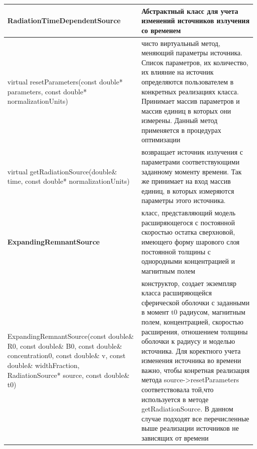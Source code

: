 \begin{small}
	\label{sourceTimeDependentMethods1}
	\begin{xtabular}{|p{0.5\textwidth}|p{0.5\textwidth}|}
		\hline
		\textbf{RadiationTimeDependentSource} & Абстрактный класс для учета изменений источников излучения со временем\\
		\hline
		virtual resetParameters(const double* parameters, const double* normalizationUnits) & чисто виртуальный метод, меняющий параметры источника. Список параметров, их количество, их влияние на источник определяются пользователем в конкретных реализациях класса. Принимает массив параметров и массив единиц в которых они измерены. Данный метод применяется в процедурах оптимизации\\
		\hline
		virtual getRadiationSource(double\& time, const double* normalizationUnits) & возвращает источник излучения с параметрами соответствующими заданному моменту времени. Так же принимает на вход массив единиц, в которых измеряются параметры этого источника.\\
		\hline
		\textbf{ExpandingRemnantSource} & класс, представляющий модель расширяющегося с постоянной скоростью остатка сверхновой, имеющего форму шарового слоя постоянной толщины с однородными концентрацией и магнитным полем \\
		\hline
		ExpandingRemnantSource(const double\& R0, const double\& B0, const double\& concentration0, const double\& v, const double\& widthFraction, RadiationSource* source, const double\& t0) & конструктор, создает экземпляр класса расширяющейся сферической оболочки с заданными в момент t0 радиусом, магнитным полем, концентрацией, скоростью расширения, отношением толщины оболочки к радиусу и моделью источника. Для коректного учета изменения источника во времени важно, чтобы конретная реализация метода source->resetParameters соответствовала той,что используется в методе getRadiationSource. В данном случае подходят все перечисленные выше реализации источников не зависящих от времени\\
		\hline
	\end{xtabular}
\end{small}
